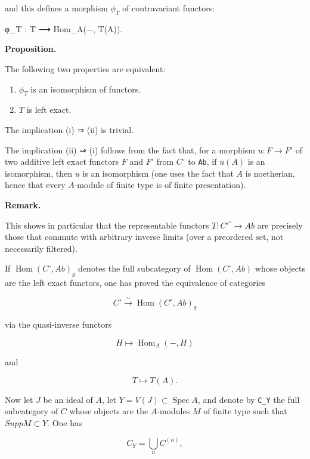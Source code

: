 \documentclass[
  11pt,
  a4paper,
]{book}
\newenvironment{Shaded}{}{}
\newcommand{\NormalTok}[1]{#1}
\providecommand{\tightlist}{%
  \setlength{\itemsep}{0pt}\setlength{\parskip}{0pt}}
\begin{document}
and this defines a morphism \(\phi_{T}\) of contravariant functors:

\begin{Shaded}
\begin{Highlighting}[]
\NormalTok{φ\_T : T ⟶ Hom\_A(−, T(A)).}
\end{Highlighting}
\end{Shaded}

\textbf{Proposition.}

The following two properties are equivalent:

\begin{enumerate}
\def\labelenumi{\arabic{enumi}.}
\tightlist
\item
  \(\phi_{T}\) is an isomorphism of functors.
\item
  \(T\) is left exact.
\end{enumerate}

The implication (i) ⇒ (ii) is trivial.

The implication (ii) ⇒ (i) follows from the fact that, for a morphism
\(u : F \to F'\) of two additive left exact functors \(F\) and \(F'\)
from \(C^{\circ}\) to \texttt{Ab}, if \(u(A)\) is an isomorphism, then
\(u\) is an isomorphism (one uses the fact that \(A\) is noetherian,
hence that every \(A\)-module of finite type is of finite presentation).

\textbf{Remark.}

This shows in particular that the representable functors
\(T : C'^{\circ} \to Ab\) are precisely those that commute with
arbitrary inverse limits (over a preordered set, not necessarily
filtered).

If \(\operatorname{Hom}(C^{\circ}, Ab)_{g}\) denotes the full
subcategory of \(\operatorname{Hom}(C^{\circ}, Ab)\) whose objects are
the left exact functors, one has proved the equivalence of categories

\[ C' \xrightarrow{\sim} \operatorname{Hom}(C^{\circ}, Ab)_{g} \]

via the quasi-inverse functors

\[ H \mapsto \operatorname{Hom}_{A}(-, H) \]

and

\[ T \mapsto T(A). \]

Now let \(J\) be an ideal of \(A\), let
\(Y = V(J) \subset \operatorname{Spec} A\), and denote by \texttt{C\_Y}
the full subcategory of \(C\) whose objects are the \(A\)-modules \(M\)
of finite type such that \(Supp M \subset Y\). One has

\[ C_{Y} = \bigcup_{n} C^{(n)}, \]
\end{document}
